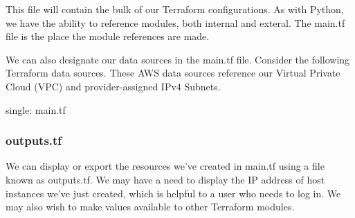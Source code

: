 This file will contain the bulk of our Terraform configurations. As with
Python, we have the ability to reference modules, both internal and
exteral. The main.tf file is the place the module references are made.

\begin{Shaded}
\begin{Highlighting}[]
 \NormalTok{ \{}
   \NormalTok{  = }
   \NormalTok{ = }

   \NormalTok{        = }
   \NormalTok{ = }

   \NormalTok{ = [}\NormalTok{]}
   \NormalTok{       = [}\NormalTok{, }\NormalTok{, }\NormalTok{]}
   \NormalTok{        = [}\NormalTok{]}
\NormalTok{\}}
\end{Highlighting}
\end{Shaded}

We can also designate our data sources in the main.tf file. Consider the
following Terraform data sources. These AWS data sources reference our
Virtual Private Cloud (VPC) and provider-assigned IPv4 Subnets.

\begin{Shaded}
\begin{Highlighting}[]
  \NormalTok{ \{}
\NormalTok{\}}

  \NormalTok{ \{}
\NormalTok{\}}
\end{Highlighting}
\end{Shaded}

single: main.tf

\hypertarget{outputs.tf}{%
\subsubsection{outputs.tf}\label{outputs.tf}}

We can display or export the resources we've created in main.tf using a
file known as outputs.tf. We may have a need to display the IP address
of host instances we've just created, which is helpful to a user who
needs to log in. We may also wish to make values available to other
Terraform modules.

